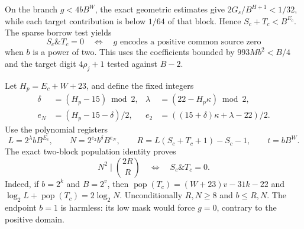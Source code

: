 On the branch $g<4bB^W$, the exact geometric estimates give
$2G_s/B^{H+1}<1/32$, while each target contribution is below $1/64$ of
that block.  Hence $S_c+T_c<B^{E_c}$.  The sparse borrow test yields
\[
 S_c\mathbin{\&}T_c=0
 \quad\Longleftrightarrow\quad
 g\text{ encodes a positive common source zero}
\]
when $b$ is a power of two.  This uses the coefficients bounded by
$993Mb^2<B/4$ and the target digit $4\rho_j+1$ tested against $B-2$.

Let $H_p=E_c+W+23$, and define the fixed integers
{\small
\begin{align*}
 \delta&=(H_p-15)\bmod2,&\lambda&=(22-H_p\kappa)\bmod2,\\
 e_N&=(H_p-15-\delta)/2,&e_2&=((15+\delta)\kappa+\lambda-22)/2.
\end{align*}
}
Use the polynomial registers
\[
 L=2^\lambda bB^{E_c},\qquad N=2^{e_2}b^\delta B^{e_N},\qquad
 R=L(S_c+T_c+1)-S_c-1,\qquad t=bB^W.
\]
The exact two-block population identity proves
\[
 N^2\mid {2R\choose R}\quad\Longleftrightarrow\quad S_c\mathbin{\&}T_c=0.
\]
Indeed, if $b=2^k$ and $B=2^v$, then
$\operatorname{pop}(T_c)=(W+23)v-31k-22$ and
$\log_2L+\operatorname{pop}(T_c)=2\log_2N$.
Unconditionally $R,N\ge8$ and $b\le R,N$.  The endpoint $b=1$ is harmless:
its low mask would force $g=0$, contrary to the positive domain.

